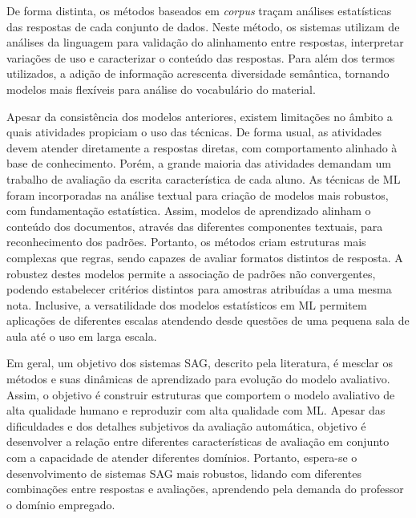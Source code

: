 De forma distinta, os métodos baseados em \textit{corpus} traçam análises estatísticas das respostas de cada conjunto de dados. Neste método, os sistemas utilizam de análises da linguagem para validação do alinhamento entre respostas, interpretar variações de uso e caracterizar o conteúdo das respostas. Para além dos termos utilizados, a adição de informação acrescenta diversidade semântica, tornando modelos mais flexíveis para análise do vocabulário do material.

Apesar da consistência dos modelos anteriores, existem limitações no âmbito a quais atividades propiciam o uso das técnicas. De forma usual, as atividades devem atender diretamente a respostas diretas, com comportamento alinhado à base de conhecimento. Porém, a grande maioria das atividades demandam um trabalho de avaliação da escrita característica de cada aluno. As técnicas de ML foram incorporadas na análise textual para criação de modelos mais robustos, com fundamentação estatística. Assim, modelos de aprendizado alinham o conteúdo dos documentos, através das diferentes componentes textuais, para reconhecimento dos padrões. Portanto, os métodos criam estruturas mais complexas que regras, sendo capazes de avaliar formatos distintos de resposta. A robustez destes modelos permite a associação de padrões não convergentes, podendo estabelecer critérios distintos para amostras atribuídas a uma mesma nota. Inclusive, a versatilidade dos modelos estatísticos em ML permitem aplicações de diferentes escalas atendendo desde questões de uma pequena sala de aula até o uso em larga escala.

Em geral, um objetivo dos sistemas SAG, descrito pela literatura, é mesclar os métodos e suas dinâmicas de aprendizado para evolução do modelo avaliativo. Assim, o objetivo é construir estruturas que comportem o modelo avaliativo de alta qualidade humano e reproduzir com alta qualidade com ML. Apesar das dificuldades e dos detalhes subjetivos da avaliação automática, objetivo é desenvolver a relação entre diferentes características de avaliação em conjunto com a capacidade de atender diferentes domínios. Portanto, espera-se o desenvolvimento de sistemas SAG mais robustos, lidando com diferentes combinações entre respostas e avaliações, aprendendo pela demanda do professor o domínio empregado.